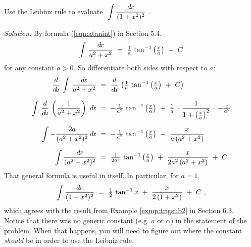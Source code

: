 \begin{exmp}\label{exmp:intleibniz1}
\noindent Use the Leibniz rule to evaluate
$~\displaystyle\int \frac{d\!x}{(1 + x^2)^2}~$.\vspace{1mm}
\par\noindent\emph{Solution:} By formula (\ref{eqn:atanint}) in Section 5.4,
\[
\int\,\frac{d\!x}{a^2 + x^2} ~=~ \tfrac{1}{a}\,\tan^{-1}\left(\tfrac{x}{a}\right) ~+~ C
\]
for any constant $a > 0$. So differentiate both sides with respect to $a$:
\begin{align*}
\frac{d}{d\!a}\,\int\,\frac{d\!x}{a^2 + x^2} ~&=~
 \frac{d}{d\!a}\,\left(\tfrac{1}{a}\,\tan^{-1}\left(\tfrac{x}{a}\right) ~+~ C\right)\\[6pt]
\int\,\frac{d}{d\!a}\,\left(\frac{1}{a^2 + x^2}\right)~d\!x ~&=~
-\tfrac{1}{a^2}\,\tan^{-1}\left(\tfrac{x}{a}\right) ~+~
\tfrac{1}{a}\,\cdot\,\frac{1}{1 + \left(\tfrac{x}{a}\right)^2}\,\cdot\,-\tfrac{x}{a^2}\\[6pt]
\int -\frac{2a}{(a^2 + x^2)^2}\,d\!x ~&=~ -\tfrac{1}{a^2}\,\tan^{-1}\left(\tfrac{x}{a}\right) ~-~
 \frac{x}{a\,(a^2 + x^2)}\\[6pt]
\int \frac{d\!x}{(a^2 + x^2)^2} ~&=~ \tfrac{1}{2a^3}\,\tan^{-1}\left(\tfrac{x}{a}\right) ~+~
\frac{x}{2a^2\,(a^2 + x^2)} ~+~ C
\end{align*}
That general formula is useful in itself. In particular, for $a=1$,
\[
\int \frac{d\!x}{(1 + x^2)^2} ~=~ \tfrac{1}{2}\,\tan^{-1} x ~+~ \frac{x}{2\,(1 + x^2)} ~+~ C ~,
\]
which agrees with the result from Example \ref{exmp:trigsub2} in Section 6.3.\\
Notice that there was no generic constant (e.g. $a$ or $\alpha$) in the
statement of the problem. When that happens, you will need to figure out where
the constant \emph{should} be in order to use the Leibniz rule.
\end{exmp}
\divider
\vspace{2mm}

